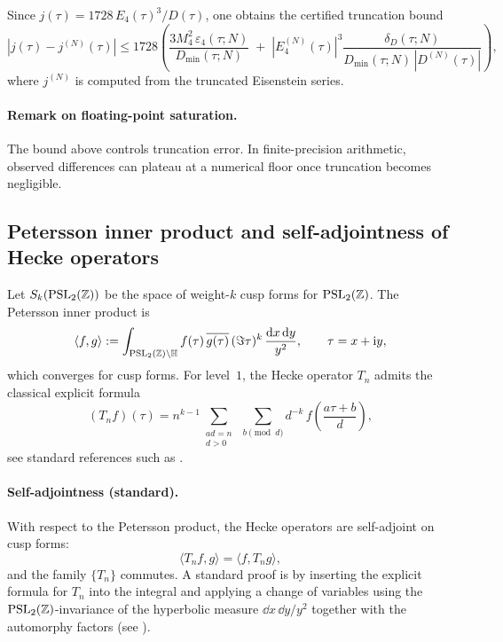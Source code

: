 Since $j(\tau)=1728\,E_4(\tau)^3/D(\tau)$, one obtains the certified truncation bound
\begin{equation}
|j(\tau)-j^{(N)}(\tau)|
\le 1728\left(
\frac{3M_4^2\,\varepsilon_4(\tau;N)}{D_{\min}(\tau;N)}
\;+\;
|E_4^{(N)}(\tau)|^3\frac{\delta_D(\tau;N)}{D_{\min}(\tau;N)\,|D^{(N)}(\tau)|}
\right),
\end{equation}
where $j^{(N)}$ is computed from the truncated Eisenstein series.

\paragraph{Remark on floating-point saturation.}
The bound above controls truncation error. In finite-precision arithmetic, observed differences can plateau at a numerical floor once truncation becomes negligible.

\subsection{Petersson inner product and self-adjointness of Hecke operators}
\label{app:petersson_selfadjoint}

Let $S_k(\mathrm{PSL}_2(\mathbb{Z}))$ be the space of weight-$k$ cusp forms for $\mathrm{PSL}_2(\mathbb{Z})$. The Petersson inner product is
\begin{equation}
\langle f,g\rangle
:=
\int_{\mathrm{PSL}_2(\mathbb{Z})\backslash\mathbb{H}} f(\tau)\,\overline{g(\tau)}\,(\Im\tau)^k\,\frac{\mathrm{d} x\,\mathrm{d} y}{y^2},
\qquad \tau=x+\mathrm{i} y,
\end{equation}
which converges for cusp forms. For level~$1$, the Hecke operator $T_n$ admits the classical explicit formula
\begin{equation}
(T_n f)(\tau)
=
n^{k-1}\sum_{\substack{ad=n\\ d>0}}\;\sum_{b\!\!\!\pmod d}
d^{-k}\,
f\!\left(\frac{a\tau+b}{d}\right),
\end{equation}
see standard references such as \cite{Apostol1990,DiamondShurman2005}.

\paragraph{Self-adjointness (standard).}
With respect to the Petersson product, the Hecke operators are self-adjoint on cusp forms:
\begin{equation}
\langle T_n f, g\rangle = \langle f, T_n g\rangle,
\end{equation}
and the family $\{T_n\}$ commutes. A standard proof is by inserting the explicit formula for $T_n$ into the integral and applying a change of variables using the $\mathrm{PSL}_2(\mathbb{Z})$-invariance of the hyperbolic measure $\dd x\,\dd y/y^2$ together with the automorphy factors (see \cite{DiamondShurman2005}).

